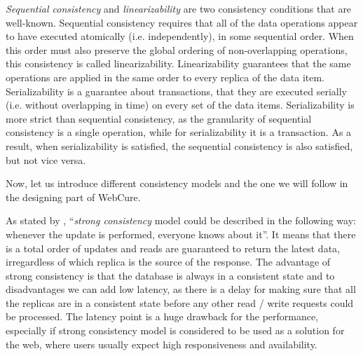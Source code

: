 \textit{Sequential consistency} and \textit{linearizability} are two consistency conditions that are well-known. Sequential consistency requires that all of the data operations appear to have executed atomically (i.e. independently), in some sequential order. When this order must also preserve the global ordering of non-overlapping operations, this consistency is called linearizability\cite{27}. Linearizability guarantees that the same operations are applied in the same order to every replica of the data item\cite{12}. Serializability is a guarantee about transactions, that they are executed serially (i.e. without overlapping in time) on every set of the data items\cite{12}. Serializability is more strict than sequential consistency, as the granularity of sequential consistency is a single operation, while for serializability it is a transaction. As a result, when serializability is satisfied, the sequential consistency is also satisfied, but not vice versa.

Now, let us introduce different consistency models and the one we will follow in the designing part of WebCure. 

As stated by \citet{10}, ``\textit{strong consistency} model could be described in the following way: whenever the update is performed, everyone knows about it''. It means that there is a total order of updates and reads are guaranteed to return the latest data, irregardless of which replica is the source of the response. The advantage of strong consistency is that the database is always in a consistent state and to disadvantages we can add low latency, as there is a delay for making sure that all the replicas are in a consistent state before any other read / write requests could be processed. The latency point is a huge drawback for the performance, especially if strong consistency model is considered to be used as a solution for the web, where users usually expect high responsiveness and availability. 

